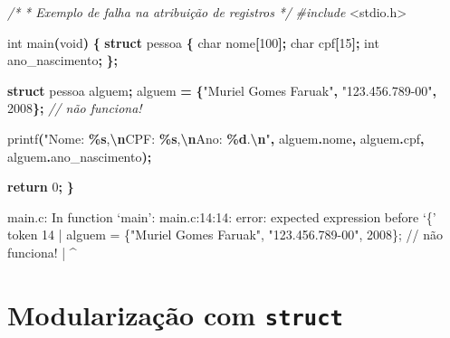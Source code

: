 \documentclass[
  11pt,
  a4paper,
]{scrbook}
\newenvironment{Shaded}{\begin{snugshade}}{\end{snugshade}}
\newcommand{\CommentTok}[1]{\textcolor[rgb]{0.56,0.35,0.01}{\textit{#1}}}
\newcommand{\ControlFlowTok}[1]{\textcolor[rgb]{0.13,0.29,0.53}{\textbf{#1}}}
\newcommand{\DataTypeTok}[1]{\textcolor[rgb]{0.13,0.29,0.53}{#1}}
\newcommand{\DecValTok}[1]{\textcolor[rgb]{0.00,0.00,0.81}{#1}}
\newcommand{\ImportTok}[1]{#1}
\newcommand{\KeywordTok}[1]{\textcolor[rgb]{0.13,0.29,0.53}{\textbf{#1}}}
\newcommand{\NormalTok}[1]{#1}
\newcommand{\OperatorTok}[1]{\textcolor[rgb]{0.81,0.36,0.00}{\textbf{#1}}}
\newcommand{\PreprocessorTok}[1]{\textcolor[rgb]{0.56,0.35,0.01}{\textit{#1}}}
\newcommand{\SpecialCharTok}[1]{\textcolor[rgb]{0.81,0.36,0.00}{\textbf{#1}}}
\newcommand{\StringTok}[1]{\textcolor[rgb]{0.31,0.60,0.02}{#1}}
\begin{document}
\begin{Shaded}
\begin{Highlighting}[]
\CommentTok{/*}
\CommentTok{ * Exemplo de falha na atribuição de registros}
\CommentTok{ */}
\PreprocessorTok{\#include }\ImportTok{\textless{}stdio.h\textgreater{}}

\DataTypeTok{int}\NormalTok{ main}\OperatorTok{(}\DataTypeTok{void}\OperatorTok{)} \OperatorTok{\{}
    \KeywordTok{struct}\NormalTok{ pessoa }\OperatorTok{\{}
        \DataTypeTok{char}\NormalTok{ nome}\OperatorTok{[}\DecValTok{100}\OperatorTok{];}
        \DataTypeTok{char}\NormalTok{ cpf}\OperatorTok{[}\DecValTok{15}\OperatorTok{];}
        \DataTypeTok{int}\NormalTok{ ano\_nascimento}\OperatorTok{;}
    \OperatorTok{\};}

    \KeywordTok{struct}\NormalTok{ pessoa alguem}\OperatorTok{;}
\NormalTok{    alguem }\OperatorTok{=} \OperatorTok{\{}\StringTok{"Muriel Gomes Faruak"}\OperatorTok{,} \StringTok{"123.456.789{-}00"}\OperatorTok{,} \DecValTok{2008}\OperatorTok{\};}  \CommentTok{// não funciona!}

\NormalTok{    printf}\OperatorTok{(}\StringTok{"Nome: }\SpecialCharTok{\%s}\StringTok{,}\SpecialCharTok{\textbackslash{}n}\StringTok{CPF: }\SpecialCharTok{\%s}\StringTok{,}\SpecialCharTok{\textbackslash{}n}\StringTok{Ano: }\SpecialCharTok{\%d}\StringTok{.}\SpecialCharTok{\textbackslash{}n}\StringTok{"}\OperatorTok{,}\NormalTok{ alguem}\OperatorTok{.}\NormalTok{nome}\OperatorTok{,}\NormalTok{ alguem}\OperatorTok{.}\NormalTok{cpf}\OperatorTok{,}
\NormalTok{           alguem}\OperatorTok{.}\NormalTok{ano\_nascimento}\OperatorTok{);}

    \ControlFlowTok{return} \DecValTok{0}\OperatorTok{;}
\OperatorTok{\}}
\end{Highlighting}
\end{Shaded}

\begin{Shaded}
\begin{Highlighting}[]
\NormalTok{main.c: In function ‘main’:}
\NormalTok{main.c:14:14: error: expected expression before ‘\{’ token}
\NormalTok{   14 |     alguem = \{"Muriel Gomes Faruak", "123.456.789{-}00", 2008\};  // }
\NormalTok{não funciona!}
\NormalTok{      |              \^{}}
\end{Highlighting}
\end{Shaded}

\section{\texorpdfstring{Modularização com
\texttt{struct}}{Modularização com struct}}\label{modularizauxe7uxe3o-com-struct}
\end{document}
